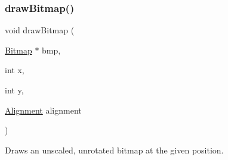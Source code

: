 \subsubsection{\texorpdfstring{draw\+Bitmap()}{drawBitmap()}}
{\footnotesize\ttfamily void draw\+Bitmap (\begin{DoxyParamCaption}\item[{\mbox{\hyperlink{struct_bitmap}{Bitmap}} $\ast$}]{bmp,  }\item[{int}]{x,  }\item[{int}]{y,  }\item[{\mbox{\hyperlink{group__bitmap_gacdfaca60ec19c0265bac2692d7982726}{Alignment}}}]{alignment }\end{DoxyParamCaption})}



Draws an unscaled, unrotated bitmap at the given position. 


